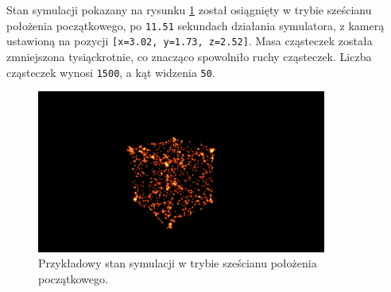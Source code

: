 \documentclass[12pt, twoside, openany]{report}
\begin{document}

Stan symulacji pokazany na rysunku \ref{fig:stan3} został osiągnięty w trybie sześcianu położenia początkowego, po \texttt{11.51} sekundach działania symulatora, z kamerą ustawioną na pozycji \texttt{[x=3.02, y=1.73, z=2.52]}. Masa cząsteczek została zmniejszona tysiąckrotnie, co znacząco spowolniło ruchy cząsteczek. Liczba cząsteczek wynosi \texttt{1500}, a kąt widzenia \texttt{50}.

\begin{figure}[H]
\centering
\includegraphics[width=0.85\textwidth,height=\textheight,keepaspectratio]{1_070.png}
\caption{Przykładowy stan symulacji w trybie sześcianu położenia początkowego.}
\label{fig:stan3}
\end{figure}
\end{document}
